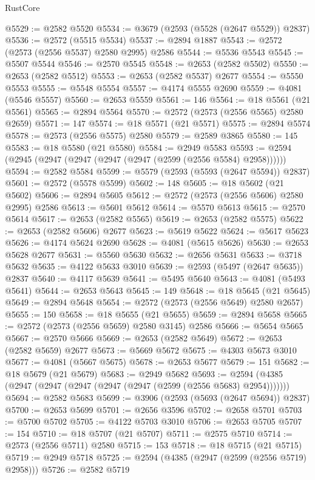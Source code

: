 \begin{lexlean}{RustCore}
\begin{coremodule}
@5529 := @2582 @5520
@5534 := @3679 (@2593 (@5528 (@2647 @5529)) @2837)
@5536 := @2572 (@5515 @5534)
@5537 := @2894 @1887
@5543 := @2572 (@2573 (@2556 @5537) @2580 @2995) @2586
@5544 := @5536 @5543
@5545 := @5507 @5544
@5546 := @2570 @5545
@5548 := @2653 (@2582 @5502)
@5550 := @2653 (@2582 @5512)
@5553 := @2653 (@2582 @5537) @2677
@5554 := @5550 @5553
@5555 := @5548 @5554
@5557 := @4174 @5555 @2690
@5559 := @4081 (@5546 @5557)
@5560 := @2653 @5559
@5561 := 146
@5564 := @18 @5561 (@21 @5561)
@5565 := @2894 @5564
@5570 := @2572 (@2573 (@2556 @5565) @2580 @2659)
@5571 := 147
@5574 := @18 @5571 (@21 @5571)
@5575 := @2894 @5574
@5578 := @2573 (@2556 @5575) @2580
@5579 := @2589 @3865
@5580 := 145
@5583 := @18 @5580 (@21 @5580)
@5584 := @2949 @5583
@5593 := @2594 (@2945 (@2947 (@2947 (@2947 (@2947 (@2599 (@2556 @5584) @2958))))))
@5594 := @2582 @5584
@5599 := @5579 (@2593 (@5593 (@2647 @5594)) @2837)
@5601 := @2572 (@5578 @5599)
@5602 := 148
@5605 := @18 @5602 (@21 @5602)
@5606 := @2894 @5605
@5612 := @2572 (@2573 (@2556 @5606) @2580 @2995) @2586
@5613 := @5601 @5612
@5614 := @5570 @5613
@5615 := @2570 @5614
@5617 := @2653 (@2582 @5565)
@5619 := @2653 (@2582 @5575)
@5622 := @2653 (@2582 @5606) @2677
@5623 := @5619 @5622
@5624 := @5617 @5623
@5626 := @4174 @5624 @2690
@5628 := @4081 (@5615 @5626)
@5630 := @2653 @5628 @2677
@5631 := @5560 @5630
@5632 := @2656 @5631
@5633 := @3718 @5632
@5635 := @4122 @5633 @3010
@5639 := @2593 (@5497 (@2647 @5635)) @2837
@5640 := @4117 @5639
@5641 := @5495 @5640
@5643 := @4081 (@5493 @5641)
@5644 := @2653 @5643
@5645 := 149
@5648 := @18 @5645 (@21 @5645)
@5649 := @2894 @5648
@5654 := @2572 (@2573 (@2556 @5649) @2580 @2657)
@5655 := 150
@5658 := @18 @5655 (@21 @5655)
@5659 := @2894 @5658
@5665 := @2572 (@2573 (@2556 @5659) @2580 @3145) @2586
@5666 := @5654 @5665
@5667 := @2570 @5666
@5669 := @2653 (@2582 @5649)
@5672 := @2653 (@2582 @5659) @2677
@5673 := @5669 @5672
@5675 := @4303 @5673 @3010
@5677 := @4081 (@5667 @5675)
@5678 := @2653 @5677
@5679 := 151
@5682 := @18 @5679 (@21 @5679)
@5683 := @2949 @5682
@5693 := @2594 (@4385 (@2947 (@2947 (@2947 (@2947 (@2947 (@2599 (@2556 @5683) @2954)))))))
@5694 := @2582 @5683
@5699 := @3906 (@2593 (@5693 (@2647 @5694)) @2837)
@5700 := @2653 @5699
@5701 := @2656 @3596
@5702 := @2658 @5701
@5703 := @5700 @5702
@5705 := @4122 @5703 @3010
@5706 := @2653 @5705
@5707 := 154
@5710 := @18 @5707 (@21 @5707)
@5711 := @2575 @5710
@5714 := @2573 (@2556 @5711) @2580
@5715 := 153
@5718 := @18 @5715 (@21 @5715)
@5719 := @2949 @5718
@5725 := @2594 (@4385 (@2947 (@2599 (@2556 @5719) @2958)))
@5726 := @2582 @5719

\end{coremodule}
\end{lexlean}

